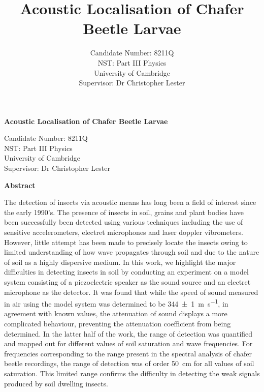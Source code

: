 \documentclass[twocolumn]{article}
\begin{document}
\pagestyle{fancy}
\thispagestyle{empty}
\onecolumn
\begin{center}
    \vspace{7cm}
    \LARGE
    \textbf{Acoustic Localisation of Chafer Beetle Larvae}\\
    \vspace{3cm}

    \Large
    Candidate Number: 8211Q\\
    NST: Part III Physics\\
    University of Cambridge\\
    Supervisor: Dr Christopher Lester
    \vspace{3cm}
\end{center}

\title{\LARGE \textbf{Acoustic Localisation of Chafer Beetle Larvae}}

\author{
    Candidate Number: 8211Q\\
    NST: Part III Physics\\
    University of Cambridge \\
    Supervisor: Dr Christopher Lester
}

\begin{center}
    \Large\textbf{Abstract}
\end{center}
The detection of insects via acoustic means has long been a field of interest since the early 1990's. The presence of insects in soil, grains and plant bodies have been successfully been detected using various techniques including the use of sensitive accelerometers, electret microphones and laser doppler vibrometers. However, little attempt has been made to precisely locate the insects owing to limited understanding of how wave propagates through soil and due to the nature of soil as a highly dispersive medium. In this work, we highlight the major difficulties in detecting insects in soil by conducting an experiment on a model system consisting of a piezoelectric speaker as the sound source and an electret microphone as the detector. It was found that while the speed of sound measured in air using the model system was determined to be \SI{344+-1}{\m\per\second}, in agreement with known values, the attenuation of sound displays a more complicated behaviour, preventing the attenuation coefficient from being determined. In the latter half of the work, the range of detection was quantified and mapped out for different values of soil saturation and wave frequencies. For frequencies corresponding to the range present in the spectral analysis of chafer beetle recordings, the range of detection was of order \SI{50}{\cm} for all values of soil saturation. This limited range confirms the difficulty in detecting the weak signals produced by soil dwelling insects.
\end{document}
